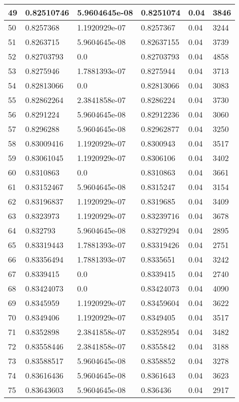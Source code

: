 \begin{longtable}{|l|l|l|l|l|l|}
49 & 0.82510746 & 5.9604645e-08 & 0.8251074 & 0.04 & 3846 \\ \hline 
50 & 0.8257368 & 1.1920929e-07 & 0.8257367 & 0.04 & 3244 \\ \hline 
51 & 0.8263715 & 5.9604645e-08 & 0.82637155 & 0.04 & 3739 \\ \hline 
52 & 0.82703793 & 0.0 & 0.82703793 & 0.04 & 4858 \\ \hline 
53 & 0.8275946 & 1.7881393e-07 & 0.8275944 & 0.04 & 3713 \\ \hline 
54 & 0.82813066 & 0.0 & 0.82813066 & 0.04 & 3083 \\ \hline 
55 & 0.82862264 & 2.3841858e-07 & 0.8286224 & 0.04 & 3730 \\ \hline 
56 & 0.8291224 & 5.9604645e-08 & 0.82912236 & 0.04 & 3060 \\ \hline 
57 & 0.8296288 & 5.9604645e-08 & 0.82962877 & 0.04 & 3250 \\ \hline 
58 & 0.83009416 & 1.1920929e-07 & 0.8300943 & 0.04 & 3517 \\ \hline 
59 & 0.83061045 & 1.1920929e-07 & 0.8306106 & 0.04 & 3402 \\ \hline 
60 & 0.8310863 & 0.0 & 0.8310863 & 0.04 & 3661 \\ \hline 
61 & 0.83152467 & 5.9604645e-08 & 0.8315247 & 0.04 & 3154 \\ \hline 
62 & 0.83196837 & 1.1920929e-07 & 0.8319685 & 0.04 & 3409 \\ \hline 
63 & 0.8323973 & 1.1920929e-07 & 0.83239716 & 0.04 & 3678 \\ \hline 
64 & 0.832793 & 5.9604645e-08 & 0.83279294 & 0.04 & 2895 \\ \hline 
65 & 0.83319443 & 1.7881393e-07 & 0.83319426 & 0.04 & 2751 \\ \hline 
66 & 0.83356494 & 1.7881393e-07 & 0.8335651 & 0.04 & 3242 \\ \hline 
67 & 0.8339415 & 0.0 & 0.8339415 & 0.04 & 2740 \\ \hline 
68 & 0.83424073 & 0.0 & 0.83424073 & 0.04 & 4090 \\ \hline 
69 & 0.8345959 & 1.1920929e-07 & 0.83459604 & 0.04 & 3622 \\ \hline 
70 & 0.8349406 & 1.1920929e-07 & 0.8349405 & 0.04 & 3517 \\ \hline 
71 & 0.8352898 & 2.3841858e-07 & 0.83528954 & 0.04 & 3482 \\ \hline 
72 & 0.83558446 & 2.3841858e-07 & 0.8355842 & 0.04 & 3188 \\ \hline 
73 & 0.83588517 & 5.9604645e-08 & 0.8358852 & 0.04 & 3278 \\ \hline 
74 & 0.83616436 & 5.9604645e-08 & 0.8361643 & 0.04 & 3623 \\ \hline 
75 & 0.83643603 & 5.9604645e-08 & 0.836436 & 0.04 & 2917 \\ \hline 
\end{longtable}